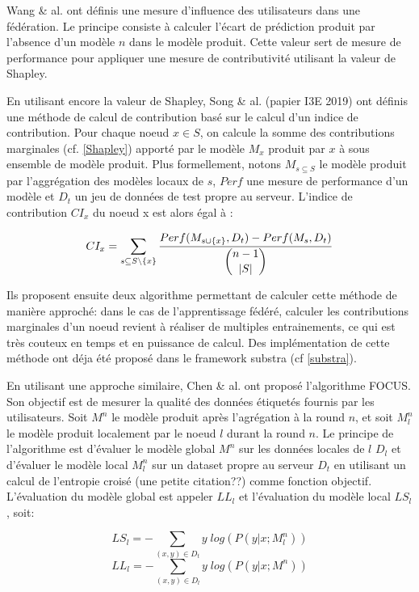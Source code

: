 \documentclass[stage3a]{tnreport} %
\begin{document}
Wang \& al. ont définis une mesure d'influence des utilisateurs dans une fédération. Le principe consiste à calculer l'écart de prédiction produit par l'absence d'un modèle $n$ dans le modèle produit. Cette valeur sert de mesure de performance pour appliquer une mesure de contributivité utilisant la valeur de Shapley. 

En utilisant encore la valeur de Shapley, Song \& al. (papier I3E 2019) ont définis une méthode de calcul de contribution basé sur le calcul d'un indice de contribution. Pour chaque noeud $x\in S$, on calcule la somme des contributions marginales (cf. \ref{Shapley}) apporté par le modèle $M_x$ produit par $x$ à sous ensemble de modèle produit. Plus formellement, notons $M_{s\subseteq{S}}$ le modèle produit par l'aggrégation des modèles locaux de $s$, $Perf$ une mesure de performance d'un modèle et $D_t$ un jeu de données de test propre au serveur. L'indice de contribution $CI_x$ du noeud x est alors égal à :

\begin{equation}
  CI_x = \sum_{s\subseteq{S\backslash\{x\}}} \frac{Perf(M_{s\cup \{x\}},D_t) - Perf(M_s,D_t)}{\dbinom{n-1}{|S|}}
\end{equation}

Ils proposent ensuite deux algorithme permettant de calculer cette méthode de manière approché: dans le cas de l'apprentissage fédéré, calculer les contributions marginales d'un noeud revient à réaliser de multiples entrainements, ce qui est très couteux en temps et en puissance de calcul. Des implémentation de cette méthode ont déja été proposé dans le framework substra (cf \ref{substra}).


 En utilisant une approche similaire, Chen \& al. ont proposé l'algorithme FOCUS. Son objectif est de mesurer la qualité des données étiquetés fournis par les utilisateurs. Soit $M^n$ le modèle produit après l'agrégation à la round $n$, et soit $M_l^n$ le modèle produit localement par le noeud $l$ durant la round $n$. Le principe de l'algorithme est d'évaluer le modèle global $M^n$ sur les données locales de $l$ $D_l$ et d'évaluer le modèle local $M_l^n$ sur un dataset propre au serveur $D_t$ en utilisant un calcul de l'entropie croisé (une petite citation??) comme fonction objectif. L'évaluation du modèle global est appeler $LL_l$ et l'évaluation du modèle local $LS_l$, soit:


\begin{equation}
    LS_l = -\sum_{(x,y)\in D_t} y \; log(P(y|x;M_l^n)) 
\end{equation}
\begin{equation}
    LL_l = -\sum_{(x,y)\in D_l} y \; log(P(y|x;M^n))
\end{equation} 
\end{document}

